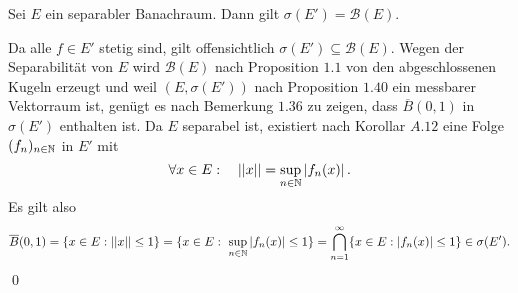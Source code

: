 \begin{proposition}
    Sei $E$ ein separabler Banachraum. Dann gilt $\sigma(E') = \mathcal{B}(E)$. 
\end{proposition}

\begin{proof*}%
    Da alle $f \in E'$ stetig sind, gilt offensichtlich $\sigma(E') \subseteq \mathcal{B}(E)$. 
    Wegen der Separabilität von $E$ wird $\mathcal{B}(E)$ nach Proposition $1.1$ von den abgeschlossenen Kugeln erzeugt und weil $(E, \sigma(E'))$ nach Proposition $1.40$ ein messbarer Vektorraum ist, genügt es nach Bemerkung $1.36$ zu zeigen, 
    dass $\overline{B}(0,1)$ in $\sigma(E')$ enthalten ist. Da $E$ separabel ist, existiert nach Korollar $A.12$ eine Folge $(f_n)_{n \in \mathbb{N}}$ in $E'$ mit
    $$
        \forall x \in E: \quad \lvert\lvert x \rvert\rvert = \sup_{n \in \mathbb{N}}\left| f_n(x) \right|.
    $$
    Es gilt also
    $$
        \overline{B}(0,1) = \{ x \in E: \lvert\lvert x \rvert\rvert \leq 1 \} = \{x \in E: \ \sup_{n \in \mathbb{N}}\left| f_n(x) \right| \leq 1 \} = \bigcap_{n=1}^{\infty}\{x \in E: \left| f_n(x) \right| \leq 1\} \in \sigma(E').
    $$
    \qed 
\end{proof*}
